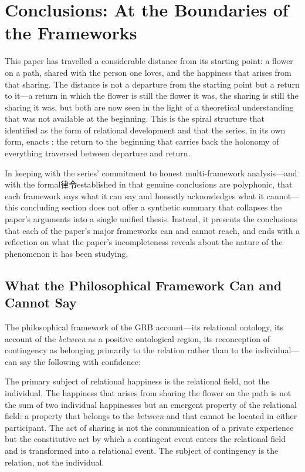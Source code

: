 \section{Conclusions: At the Boundaries of the Frameworks}
\label{p14:sec:conclusions}

\noindent
This paper has travelled a considerable distance from its starting point: a flower on a path, shared with the person one loves, and the happiness that arises from that sharing. The distance is not a departure from the starting point but a return to it---a return in which the flower is still the flower it was, the sharing is still the sharing it was, but both are now seen in the light of a theoretical understanding that was not available at the beginning. This is the spiral structure that  identified as the form of relational development and that the series, in its own form, enacts \parencite{paperix}: the return to the beginning that carries back the holonomy of everything traversed between departure and return.

In keeping with the series' commitment to honest multi-framework analysis---and with the formal律令established in  that genuine conclusions are polyphonic, that each framework says what it can say and honestly acknowledges what it cannot---this concluding section does not offer a synthetic summary that collapses the paper's arguments into a single unified thesis. Instead, it presents the conclusions that each of the paper's major frameworks can and cannot reach, and ends with a reflection on what the paper's incompleteness reveals about the nature of the phenomenon it has been studying.

\subsection{What the Philosophical Framework Can and Cannot Say}
\label{p14:subsec:conc_phil}

\noindent
The philosophical framework of the GRB account---its relational ontology, its account of the \emph{between} as a positive ontological region, its reconception of contingency as belonging primarily to the relation rather than to the individual---can say the following with confidence:

The primary subject of relational happiness is the relational field, not the individual. The happiness that arises from sharing the flower on the path is not the sum of two individual happinesses but an emergent property of the relational field: a property that belongs to the \emph{between} and that cannot be located in either participant. The act of sharing is not the communication of a private experience but the constitutive act by which a contingent event enters the relational field and is transformed into a relational event. The subject of contingency is the relation, not the individual.

